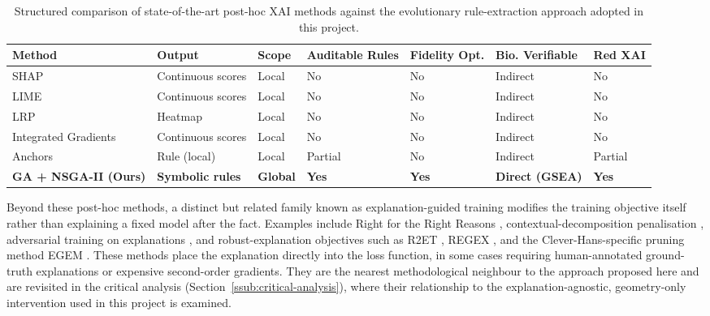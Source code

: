 \begin{table}[H]
\centering
\small
\caption{Structured comparison of state-of-the-art post-hoc XAI methods against the evolutionary
rule-extraction approach adopted in this project.}
\label{tab:sota_comparison}
\begin{tabular}{p{1.9cm}p{1.7cm}p{1.0cm}p{1.5cm}p{1.3cm}p{1.6cm}p{1.1cm}}
\toprule
\textbf{Method} & \textbf{Output} & \textbf{Scope} & \textbf{Auditable Rules} & \textbf{Fidelity Opt.} & \textbf{Bio. Verifiable} & \textbf{Red XAI} \\
\midrule
SHAP & Continuous scores & Local & No & No & Indirect & No \\
LIME & Continuous scores & Local & No & No & Indirect & No \\
LRP & Heatmap & Local & No & No & Indirect & No \\
Integrated Gradients & Continuous scores & Local & No & No & Indirect & No \\
Anchors & Rule (local) & Local & Partial & No & Indirect & Partial \\
\textbf{GA + NSGA-II (Ours)} & \textbf{Symbolic rules} & \textbf{Global} & \textbf{Yes} & \textbf{Yes} & \textbf{Direct (GSEA)} & \textbf{Yes} \\
\bottomrule
\end{tabular}
\end{table}

\noindent
Beyond these post-hoc methods, a distinct but related family known as explanation-guided training
modifies the training objective itself rather than explaining a fixed model after the fact. Examples
include Right for the Right Reasons \cite{Ross2017}, contextual-decomposition penalisation
\cite{Rieger2020}, adversarial training on explanations \cite{Tang2022}, and robust-explanation
objectives such as R2ET \cite{Chen2022}, REGEX \cite{Li2023}, and the Clever-Hans-specific pruning
method EGEM \cite{Linhardt2024}. These methods place the explanation directly into the loss function, in
some cases requiring human-annotated ground-truth explanations or expensive second-order gradients. They
are the nearest methodological neighbour to the approach proposed here and are revisited in the critical
analysis (Section~\ref{ssub:critical-analysis}), where their relationship to the explanation-agnostic,
geometry-only intervention used in this project is examined.